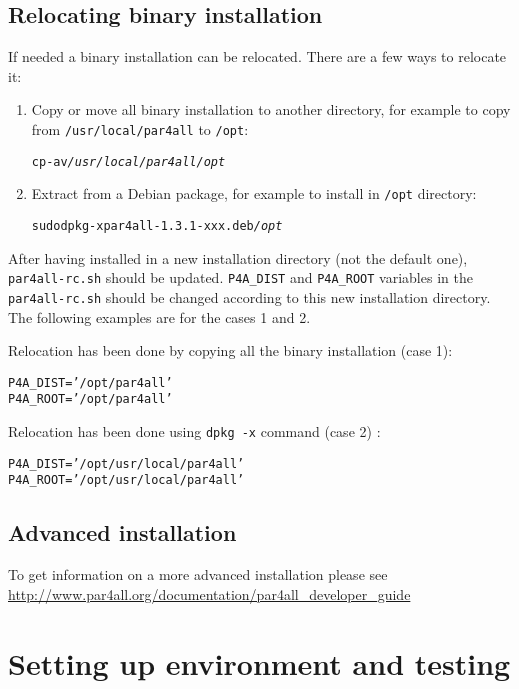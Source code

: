 \documentclass[a4paper]{article}
\begin{document}
\subsection{Relocating binary installation}
\label{sec:relocation}
If needed a \Apfa binary installation can be relocated. There are a few ways to relocate it:

\begin{enumerate}
\item Copy or move all \Apfa binary installation to another directory, for
  example to copy from \texttt{/usr/local/par4all} to \texttt{/opt}:
\begin{alltt}
cp -av \emph{/usr/local/par4all} \emph{/opt}
\end{alltt}

\item Extract from a Debian package, for example to install
  \Apfa in \texttt{/opt} directory:
\begin{alltt}
sudo dpkg -x par4all-1.3.1-xxx.deb \emph{/opt}
\end{alltt}

\end{enumerate}

After having installed \Apfa in a new installation directory (not the
default one), \verb|par4all-rc.sh| should be updated.  \verb|P4A_DIST| and
\verb|P4A_ROOT| variables in the \verb|par4all-rc.sh| should be changed
according to this new installation directory.  The following examples are
for the cases 1 and 2.

Relocation has been done by copying all the binary installation (case 1):
\begin{alltt}
P4A_DIST='/opt/par4all'
P4A_ROOT='/opt/par4all'
\end{alltt}

Relocation has been done using \texttt{dpkg -x} command (case 2) :
\begin{alltt}
P4A_DIST='/opt/usr/local/par4all'
P4A_ROOT='/opt/usr/local/par4all'
\end{alltt}


\subsection{Advanced installation}

To get information on a more advanced installation please see
\url{http://www.par4all.org/documentation/par4all_developer_guide}


\section{Setting up environment and testing \protect\Apfa}
\label{sec:testing}
\end{document}

